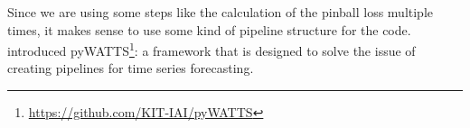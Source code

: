 Since we are using some steps like the calculation of the pinball loss multiple times, 
it makes sense to use some kind of pipeline structure for the code. 
\Textcite{Heidrich2021} introduced 
pyWATTS\footnote{\url{https://github.com/KIT-IAI/pyWATTS}}: a framework 
that is designed to solve the issue of creating pipelines for time series 
forecasting. 






